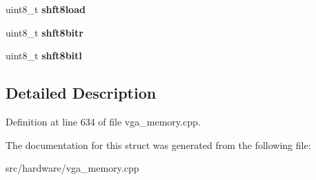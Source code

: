 \begin{DoxyCompactItemize}
\item 
\hypertarget{structpc98__egc__shifter_a44b7ff1080cebfaa856018070a19a98e}{uint8\-\_\-t {\bfseries shft8load}}\label{structpc98__egc__shifter_a44b7ff1080cebfaa856018070a19a98e}

\item 
\hypertarget{structpc98__egc__shifter_a968d6e511309e3289ce34f8311a99173}{uint8\-\_\-t {\bfseries shft8bitr}}\label{structpc98__egc__shifter_a968d6e511309e3289ce34f8311a99173}

\item 
\hypertarget{structpc98__egc__shifter_a0e66557cbae4552f7d391a22e507fd16}{uint8\-\_\-t {\bfseries shft8bitl}}\label{structpc98__egc__shifter_a0e66557cbae4552f7d391a22e507fd16}

\end{DoxyCompactItemize}


\subsection{Detailed Description}


Definition at line 634 of file vga\-\_\-memory.\-cpp.



The documentation for this struct was generated from the following file\-:\begin{DoxyCompactItemize}
\item 
src/hardware/vga\-\_\-memory.\-cpp\end{DoxyCompactItemize}

